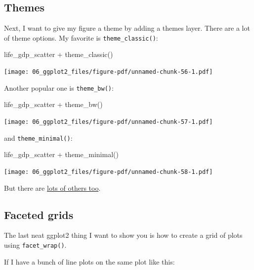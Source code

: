 \documentclass[
  letterpaper,
  DIV=11,
  numbers=noendperiod]{scrreprt}
\newenvironment{Shaded}{\begin{snugshade}}{\end{snugshade}}
\newcommand{\FunctionTok}[1]{\textcolor[rgb]{0.28,0.35,0.67}{#1}}
\newcommand{\NormalTok}[1]{\textcolor[rgb]{0.00,0.23,0.31}{#1}}
\newcommand{\SpecialCharTok}[1]{\textcolor[rgb]{0.37,0.37,0.37}{#1}}
\begin{document}
\subsection{Themes}\label{themes}

Next, I want to give my figure a theme by adding a themes layer. There
are a lot of theme options. My favorite is \texttt{theme\_classic()}:

\begin{Shaded}
\begin{Highlighting}[]
\NormalTok{life\_gdp\_scatter }\SpecialCharTok{+} \FunctionTok{theme\_classic}\NormalTok{()}
\end{Highlighting}
\end{Shaded}

\texttt{[image: 06\_ggplot2\_files/figure-pdf/unnamed-chunk-56-1.pdf]}

Another popular one is \texttt{theme\_bw()}:

\begin{Shaded}
\begin{Highlighting}[]
\NormalTok{life\_gdp\_scatter }\SpecialCharTok{+} \FunctionTok{theme\_bw}\NormalTok{()}
\end{Highlighting}
\end{Shaded}

\texttt{[image: 06\_ggplot2\_files/figure-pdf/unnamed-chunk-57-1.pdf]}

and \texttt{theme\_minimal()}:

\begin{Shaded}
\begin{Highlighting}[]
\NormalTok{life\_gdp\_scatter }\SpecialCharTok{+} \FunctionTok{theme\_minimal}\NormalTok{()}
\end{Highlighting}
\end{Shaded}

\texttt{[image: 06\_ggplot2\_files/figure-pdf/unnamed-chunk-58-1.pdf]}

But there are
\href{https://ggplot2.tidyverse.org/reference/ggtheme.html}{lots of
others too}.

\subsection{Faceted grids}\label{faceted-grids}

The last neat ggplot2 thing I want to show you is how to create a grid
of plots using \texttt{facet\_wrap()}.

If I have a bunch of line plots on the same plot like this:
\end{document}
